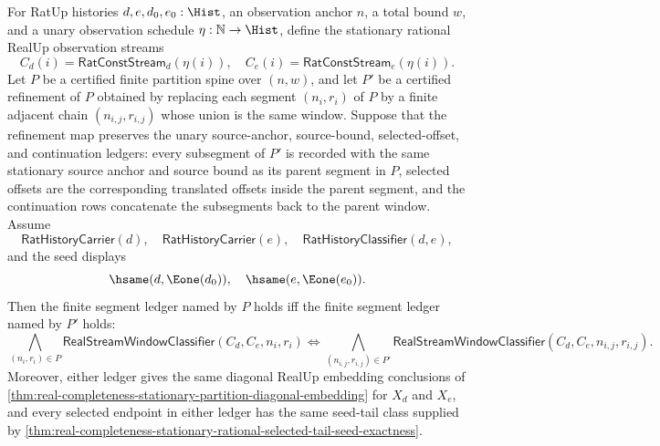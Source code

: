 \begin{theorem}
\label{thm:real-completeness-stationary-partition-refinement-invariance}
For RatUp histories $d,e,d_0,e_0:\Hist$, an observation anchor $n$, a total
bound $w$, and a unary observation schedule $\eta:\mathbb{N}\to\Hist$, define
the stationary rational RealUp observation streams
$$
C_d(i)=\mathsf{RatConstStream}_d(\eta(i)),
\quad
C_e(i)=\mathsf{RatConstStream}_e(\eta(i)).
$$
Let $P$ be a certified finite partition spine over $(n,w)$, and let $P'$ be a
certified refinement of $P$ obtained by replacing each segment $(n_i,r_i)$ of
$P$ by a finite adjacent chain $(n_{i,j},r_{i,j})$ whose union is the same
window. Suppose that the refinement map preserves the unary source-anchor,
source-bound, selected-offset, and continuation ledgers: every subsegment of
$P'$ is recorded with the same stationary source anchor and source bound as
its parent segment in $P$, selected offsets are the corresponding translated
offsets inside the parent segment, and the continuation rows concatenate the
subsegments back to the parent window.
Assume
$$
\mathsf{RatHistoryCarrier}(d),\quad
\mathsf{RatHistoryCarrier}(e),\quad
\mathsf{RatHistoryClassifier}(d,e),
$$
and the seed displays
$$
\hsame(d,\Eone(d_0)),\quad
\hsame(e,\Eone(e_0)).
$$
Then the finite segment ledger named by $P$ holds iff the finite segment ledger
named by $P'$ holds:
$$
\bigwedge_{(n_i,r_i)\in P}
\mathsf{RealStreamWindowClassifier}(C_d,C_e,n_i,r_i)
\Longleftrightarrow
\bigwedge_{(n_{i,j},r_{i,j})\in P'}
\mathsf{RealStreamWindowClassifier}(C_d,C_e,n_{i,j},r_{i,j}).
$$
Moreover, either ledger gives the same diagonal RealUp embedding conclusions
of
\autoref{thm:real-completeness-stationary-partition-diagonal-embedding} for
$X_d$ and $X_e$, and every selected endpoint in either ledger has the same
seed-tail class supplied by
\autoref{thm:real-completeness-stationary-rational-selected-tail-seed-exactness}.
\end{theorem}

